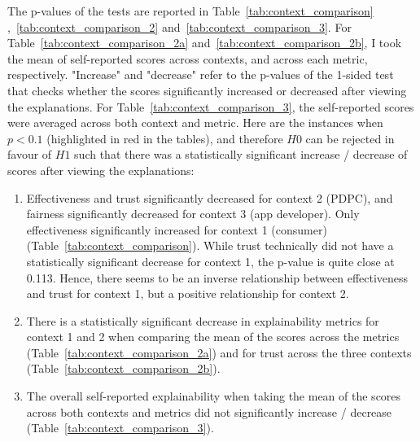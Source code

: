 The p-values of the tests are reported in Table~\ref{tab:context_comparison} ,~\ref{tab:context_comparison_2} and~\ref{tab:context_comparison_3}. For Table~\ref{tab:context_comparison_2a} and~\ref{tab:context_comparison_2b}, I took the mean of self-reported scores across contexts, and across each metric, respectively. "Increase" and "decrease" refer to the p-values of the 1-sided test that checks whether the scores significantly increased or decreased after viewing the explanations. For Table~\ref{tab:context_comparison_3}, the self-reported scores were averaged across both context and metric.  Here are the instances when $p<0.1$ (highlighted in red in the tables), and therefore $H0$ can be rejected in favour of $H1$ such that there was a statistically significant increase / decrease of scores after viewing the explanations:
\begin{enumerate}
    \item Effectiveness and trust significantly decreased for context 2 (PDPC), and fairness significantly decreased for context 3 (app developer). Only effectiveness significantly increased for context 1 (consumer) (Table~\ref{tab:context_comparison}). While trust technically did not have a statistically significant decrease for context 1, the p-value is quite close at 0.113. Hence, there seems to be an inverse relationship between effectiveness and trust for context 1, but a positive relationship for context 2.
    \item There is a statistically significant decrease in explainability metrics for context 1 and 2 when comparing the mean of the scores across the metrics (Table~\ref{tab:context_comparison_2a}) and for trust across the three contexts (Table~\ref{tab:context_comparison_2b}).
    \item The overall self-reported explainability when taking the mean of the scores across both contexts and metrics did not significantly increase / decrease (Table~\ref{tab:context_comparison_3}).
\end{enumerate}

